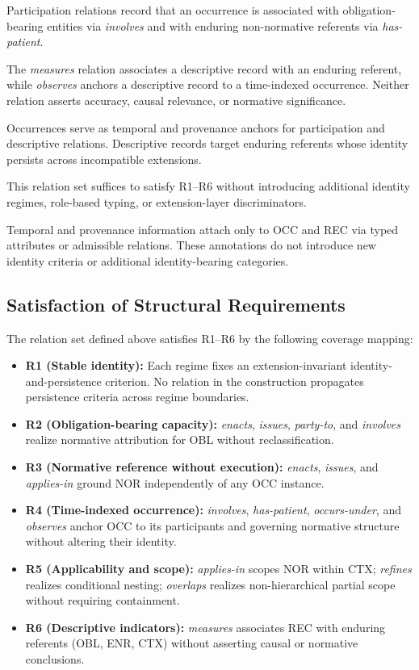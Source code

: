 Participation relations record that an occurrence
is associated with obligation-bearing entities via \emph{involves}
and with enduring non-normative referents via \emph{has-patient}.

The \emph{measures} relation associates a descriptive record
with an enduring referent,
while \emph{observes} anchors a descriptive record
to a time-indexed occurrence.
Neither relation asserts accuracy, causal relevance,
or normative significance.

Occurrences serve as temporal and provenance anchors
for participation and descriptive relations.
Descriptive records target enduring referents whose identity
persists across incompatible extensions.

This relation set suffices to satisfy R1--R6
without introducing additional identity regimes,
role-based typing, or extension-layer discriminators.

Temporal and provenance information attach only to OCC and REC
via typed attributes or admissible relations.
These annotations do not introduce new identity criteria
or additional identity-bearing categories.

\subsection{Satisfaction of Structural Requirements}
\label{sec:requirements_verification}

The relation set defined above satisfies R1--R6 by the
following coverage mapping:

\begin{itemize}
  \item \textbf{R1 (Stable identity):}
        Each regime fixes an extension-invariant
        identity-and-persistence criterion.
        No relation in the construction propagates
        persistence criteria across regime boundaries.
  \item \textbf{R2 (Obligation-bearing capacity):}
        \textit{enacts}, \textit{issues}, \textit{party-to},
        and \textit{involves} realize normative attribution
        for OBL without reclassification.
  \item \textbf{R3 (Normative reference without execution):}
        \textit{enacts}, \textit{issues}, and \textit{applies-in}
        ground NOR independently of any OCC instance.
  \item \textbf{R4 (Time-indexed occurrence):}
        \textit{involves}, \textit{has-patient}, \textit{occurs-under},
        and \textit{observes} anchor OCC to its participants
        and governing normative structure
        without altering their identity.
  \item \textbf{R5 (Applicability and scope):}
        \textit{applies-in} scopes NOR within CTX;
        \textit{refines} realizes conditional nesting;
        \textit{overlaps} realizes non-hierarchical
        partial scope without requiring containment.
  \item \textbf{R6 (Descriptive indicators):}
        \textit{measures} associates REC with enduring
        referents (OBL, ENR, CTX) without asserting
        causal or normative conclusions.
\end{itemize}

